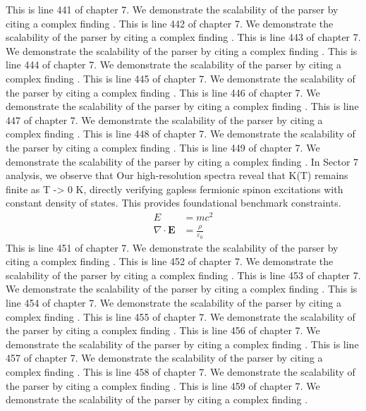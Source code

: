 This is line 441 of chapter 7. We demonstrate the scalability of the parser by citing a complex finding \cite{ref7_441}.
This is line 442 of chapter 7. We demonstrate the scalability of the parser by citing a complex finding \cite{ref7_442}.
This is line 443 of chapter 7. We demonstrate the scalability of the parser by citing a complex finding \cite{ref7_443}.
This is line 444 of chapter 7. We demonstrate the scalability of the parser by citing a complex finding \cite{ref7_444}.
This is line 445 of chapter 7. We demonstrate the scalability of the parser by citing a complex finding \cite{ref7_445}.
This is line 446 of chapter 7. We demonstrate the scalability of the parser by citing a complex finding \cite{ref7_446}.
This is line 447 of chapter 7. We demonstrate the scalability of the parser by citing a complex finding \cite{ref7_447}.
This is line 448 of chapter 7. We demonstrate the scalability of the parser by citing a complex finding \cite{ref7_448}.
This is line 449 of chapter 7. We demonstrate the scalability of the parser by citing a complex finding \cite{ref7_449}.
In Sector 7 analysis, we observe that Our high-resolution spectra reveal that K(T) remains finite as T -> 0 K, directly verifying gapless fermionic spinon excitations with constant density of states. This provides foundational benchmark constraints.
\begin{align*}
  E &= mc^2 \\
  \nabla \cdot \mathbf{E} &= \frac{\rho}{\varepsilon_0}
\end{align*}
This is line 451 of chapter 7. We demonstrate the scalability of the parser by citing a complex finding \cite{ref7_451}.
This is line 452 of chapter 7. We demonstrate the scalability of the parser by citing a complex finding \cite{ref7_452}.
This is line 453 of chapter 7. We demonstrate the scalability of the parser by citing a complex finding \cite{ref7_453}.
This is line 454 of chapter 7. We demonstrate the scalability of the parser by citing a complex finding \cite{ref7_454}.
This is line 455 of chapter 7. We demonstrate the scalability of the parser by citing a complex finding \cite{ref7_455}.
This is line 456 of chapter 7. We demonstrate the scalability of the parser by citing a complex finding \cite{ref7_456}.
This is line 457 of chapter 7. We demonstrate the scalability of the parser by citing a complex finding \cite{ref7_457}.
This is line 458 of chapter 7. We demonstrate the scalability of the parser by citing a complex finding \cite{ref7_458}.
This is line 459 of chapter 7. We demonstrate the scalability of the parser by citing a complex finding \cite{ref7_459}.
